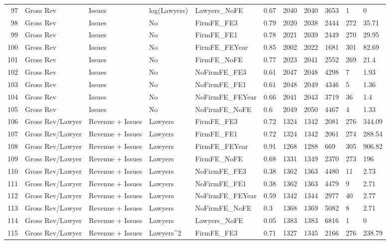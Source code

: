 \begin{table}[ht]
\begin{tabular}{rllllllllll}
  97 & Gross Rev & Issues & log(Lawyers) & Lawyers\_NoFE & 0.67 & 2040 & 2040 & 3653 & 1 & 0 \\ 
  98 & Gross Rev & Issues & No & FirmFE\_FE3 & 0.79 & 2020 & 2038 & 2444 & 272 & 35.71 \\ 
  99 & Gross Rev & Issues & No & FirmFE\_FE1 & 0.78 & 2021 & 2039 & 2449 & 270 & 29.95 \\ 
  100 & Gross Rev & Issues & No & FirmFE\_FEYear & 0.85 & 2002 & 2022 & 1681 & 301 & 82.69 \\ 
  101 & Gross Rev & Issues & No & FirmFE\_NoFE & 0.77 & 2023 & 2041 & 2552 & 269 & 21.4 \\ 
  102 & Gross Rev & Issues & No & NoFirmFE\_FE3 & 0.61 & 2047 & 2048 & 4298 & 7 & 1.93 \\ 
  103 & Gross Rev & Issues & No & NoFirmFE\_FE1 & 0.61 & 2048 & 2049 & 4346 & 5 & 1.36 \\ 
  104 & Gross Rev & Issues & No & NoFirmFE\_FEYear & 0.66 & 2041 & 2043 & 3719 & 36 & 1.4 \\ 
  105 & Gross Rev & Issues & No & NoFirmFE\_NoFE & 0.6 & 2049 & 2050 & 4467 & 4 & 1.33 \\ 
  106 & Gross Rev/Lawyer & Revenue + Issues & Lawyers & FirmFE\_FE3 & 0.72 & 1324 & 1342 & 2081 & 276 & 344.09 \\ 
  107 & Gross Rev/Lawyer & Revenue + Issues & Lawyers & FirmFE\_FE1 & 0.72 & 1324 & 1342 & 2061 & 274 & 288.54 \\ 
  108 & Gross Rev/Lawyer & Revenue + Issues & Lawyers & FirmFE\_FEYear & 0.91 & 1268 & 1288 & 669 & 305 & 906.82 \\ 
  109 & Gross Rev/Lawyer & Revenue + Issues & Lawyers & FirmFE\_NoFE & 0.68 & 1331 & 1349 & 2370 & 273 & 196 \\ 
  110 & Gross Rev/Lawyer & Revenue + Issues & Lawyers & NoFirmFE\_FE3 & 0.38 & 1362 & 1363 & 4480 & 11 & 2.73 \\ 
  111 & Gross Rev/Lawyer & Revenue + Issues & Lawyers & NoFirmFE\_FE1 & 0.38 & 1362 & 1363 & 4479 & 9 & 2.71 \\ 
  112 & Gross Rev/Lawyer & Revenue + Issues & Lawyers & NoFirmFE\_FEYear & 0.59 & 1342 & 1344 & 2977 & 40 & 2.77 \\ 
  113 & Gross Rev/Lawyer & Revenue + Issues & Lawyers & NoFirmFE\_NoFE & 0.3 & 1368 & 1369 & 5082 & 8 & 2.71 \\ 
  114 & Gross Rev/Lawyer & Revenue + Issues & Lawyers & Lawyers\_NoFE & 0.05 & 1383 & 1383 & 6816 & 1 & 0 \\ 
  115 & Gross Rev/Lawyer & Revenue + Issues & Lawyers^2 & FirmFE\_FE3 & 0.71 & 1327 & 1345 & 2166 & 276 & 238.79 \\ 

\end{tabular}
\end{table}
